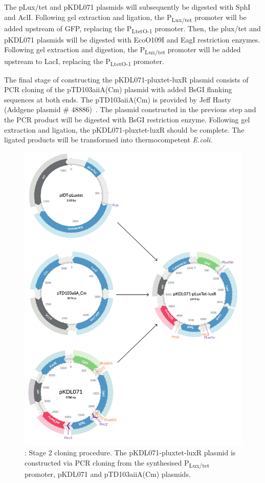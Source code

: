 The pLux/tet and pKDL071 plasmids will subsequently be digested with SphI and AclI. Following gel extraction and ligation, the P\textsubscript{Lux/tet} promoter will be added upstream of GFP, replacing the P\textsubscript{LtetO-1} promoter. Then, the plux/tet and pKDL071 plasmids will be digested with EcoO109I and EagI restriction enzymes. Following gel extraction and digestion, the P\textsubscript{Lux/tet} promoter will be added upstream to LacI, replacing the P\textsubscript{LtetO-1} promoter. 


The final stage of constructing the pKDL071-pluxtet-luxR plasmid consists of PCR cloning of the pTD103aiiA(Cm) plasmid with added BsGI flanking sequences at both ends. The pTD103aiiA(Cm) is provided by Jeff Hasty (Addgene plasmid \# 48886)~\autocite{Prindle:2012cj}. The plasmid constructed in the previous step and the PCR product will be digested with BsGI restriction enzyme. Following gel extraction and ligation, the pKDL071-pluxtet-luxR should be complete. The ligated products will be transformed into thermocompetent \textit{E.coli}.


\begin{figure}[htbp]
	\begin{center}
		\includegraphics[scale=0.6]{../../chapters/chapterDesignSwitches/images/stage2_cloning.pdf}
		\caption[Stage 2 cloning procedure.]{\label{fig:stage2}: Stage 2 cloning procedure. The pKDL071-pluxtet-luxR  plasmid is constructed via PCR cloning from the synthesised P\textsubscript{Lux/tet} promoter, pKDL071 and pTD103aiiA(Cm) plasmids.}
	\end{center}
\end{figure}

